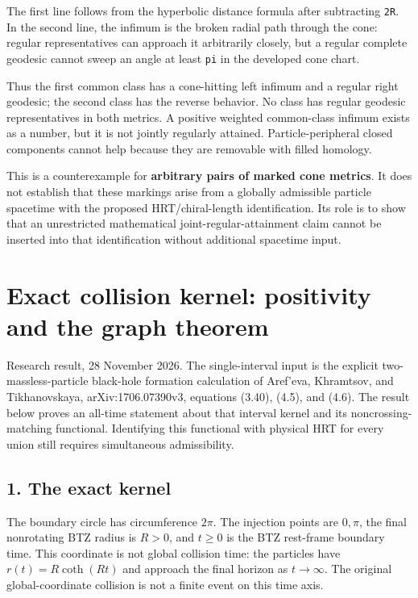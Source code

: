 \documentclass[11pt]{article}
\begin{document}
The first line follows from the hyperbolic distance formula after
subtracting \texttt{2R}. In the second line, the infimum is the broken
radial path through the cone: regular representatives can approach it
arbitrarily closely, but a regular complete geodesic cannot sweep an
angle at least \texttt{pi} in the developed cone chart.

Thus the first common class has a cone-hitting left infimum and a
regular right geodesic; the second class has the reverse behavior. No
class has regular geodesic representatives in both metrics. A positive
weighted common-class infimum exists as a number, but it is not jointly
regularly attained. Particle-peripheral closed components cannot help
because they are removable with filled homology.

This is a counterexample for \textbf{arbitrary pairs of marked cone
metrics}. It does not establish that these markings arise from a
globally admissible particle spacetime with the proposed
HRT/chiral-length identification. Its role is to show that an
unrestricted mathematical joint-regular-attainment claim cannot be
inserted into that identification without additional spacetime input.

\clearpage

\section{Exact collision kernel: positivity and the graph
theorem}\label{exact-collision-kernel-positivity-and-the-graph-theorem}

Research result, 28 November 2026. The single-interval input is the
explicit two-massless-particle black-hole formation calculation of
Aref'eva, Khramtsov, and Tikhanovskaya, arXiv:1706.07390v3, equations
(3.40), (4.5), and (4.6). The result below proves an all-time statement
about that interval kernel and its noncrossing-matching functional.
Identifying this functional with physical HRT for every union still
requires simultaneous admissibility.

\subsection{1. The exact kernel}\label{the-exact-kernel}

The boundary circle has circumference \(2\pi\). The injection points are
\(0,\pi\), the final nonrotating BTZ radius is \(R>0\), and \(t\ge0\) is
the BTZ rest-frame boundary time. This coordinate is not global
collision time: the particles have \(r(t)=R\coth(Rt)\) and approach the
final horizon as \(t\to\infty\). The original global-coordinate
collision is not a finite event on this time axis.
\end{document}
